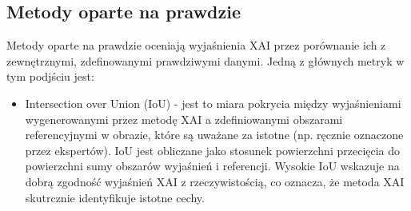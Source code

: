 \subsection*{Metody oparte na prawdzie}
Metody oparte na prawdzie oceniają wyjaśnienia XAI przez porównanie ich z zewnętrznymi, zdefinowanymi prawdziwymi danymi. Jedną z głównych metryk w tym podjściu jest:
\begin{itemize}
	\item Intersection over Union (IoU) - jest to miara pokrycia między wyjaśnieniami wygenerowanymi przez metodę XAI a zdefiniowanymi obszarami referencyjnymi w obrazie, które są uważane za istotne (np. ręcznie oznaczone przez ekspertów).
	      IoU jest obliczane jako stosunek powierzchni przecięcia do powierzchni sumy obszarów wyjaśnień i referencji. Wysokie IoU wskazuje na dobrą zgodność wyjaśnień XAI z rzeczywistością, co oznacza, że metoda XAI skutrcznie identyfikuje istotne cechy.
\end{itemize}
